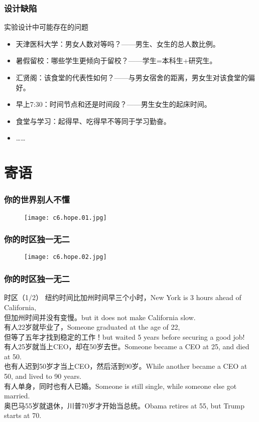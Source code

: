 \begin{frame}
  \frametitle{设计缺陷}
  \begin{block}{实验设计中可能存在的问题}
    \begin{itemize}
      \item 天津医科大学：男女人数对等吗？——男生、女生的总人数比例。
      \item 暑假留校：哪些学生更倾向于留校？——学生=本科生+研究生。
      \item 汇贤阁：该食堂的代表性如何？——与男女宿舍的距离，男女生对该食堂的偏好。
      \item 早上7:30：时间节点和还是时间段？——男生女生的起床时间。
      \item 食堂与学习：起得早、吃得早不等同于学习勤奋。
      \item ……
    \end{itemize}
  \end{block}
\end{frame}

\section{寄语}
\begin{frame}
  \frametitle{你的世界别人不懂}
  \begin{figure}
    \centering
    \texttt{[image: c6.hope.01.jpg]}
  \end{figure}
\end{frame}

\begin{frame}
  \frametitle{你的时区独一无二}
  \begin{figure}
    \centering
    \texttt{[image: c6.hope.02.jpg]}
  \end{figure}
\end{frame}

\begin{frame}
  \frametitle{你的时区独一无二}
  \begin{block}{时区（1/2）}
纽约时间比加州时间早三个小时，New York is 3 hours ahead of California,\\
但加州时间并没有变慢。but it does not make California slow.\\
有人22岁就毕业了，Someone graduated at the age of 22,\\
但等了五年才找到稳定的工作！but waited 5 years before securing a good job!\\
有人25岁就当上CEO，却在50岁去世。Someone became a CEO at 25, and died at 50.\\
也有人迟到50岁才当上CEO，然后活到90岁。While another became a CEO at 50, and lived to 90 years.\\
有人单身，同时也有人已婚。Someone is still single, while someone else got married.\\
奥巴马55岁就退休，川普70岁才开始当总统。Obama retires at 55, but Trump starts at 70.\\
  \end{block}
\end{frame}

